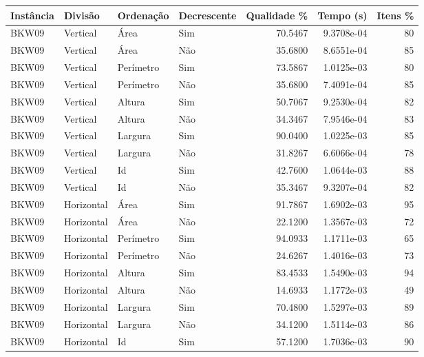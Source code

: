 \begin{tabular}{llllrrr}
\hline
Instância & Divisão     & Ordenação & Decrescente & Qualidade \% & Tempo (s)  & Itens \% \\
\hline
BKW09     & Vertical    & Área      & Sim         & 70.5467      & 9.3708e-04 & 80       \\
BKW09     & Vertical    & Área      & Não         & 35.6800      & 8.6551e-04 & 85       \\
BKW09     & Vertical    & Perímetro & Sim         & 73.5867      & 1.0125e-03 & 80       \\
BKW09     & Vertical    & Perímetro & Não         & 35.6800      & 7.4091e-04 & 85       \\
BKW09     & Vertical    & Altura    & Sim         & 50.7067      & 9.2530e-04 & 82       \\
BKW09     & Vertical    & Altura    & Não         & 34.3467      & 7.9546e-04 & 83       \\
BKW09     & Vertical    & Largura   & Sim         & 90.0400      & 1.0225e-03 & 85       \\
BKW09     & Vertical    & Largura   & Não         & 31.8267      & 6.6066e-04 & 78       \\
BKW09     & Vertical    & Id        & Sim         & 42.7600      & 1.0644e-03 & 88       \\
BKW09     & Vertical    & Id        & Não         & 35.3467      & 9.3207e-04 & 82       \\
BKW09     & Horizontal  & Área      & Sim         & 91.7867      & 1.6902e-03 & 95       \\
BKW09     & Horizontal  & Área      & Não         & 22.1200      & 1.3567e-03 & 72       \\
BKW09     & Horizontal  & Perímetro & Sim         & 94.0933      & 1.1711e-03 & 65       \\
BKW09     & Horizontal  & Perímetro & Não         & 24.6267      & 1.4016e-03 & 73       \\
BKW09     & Horizontal  & Altura    & Sim         & 83.4533      & 1.5490e-03 & 94       \\
BKW09     & Horizontal  & Altura    & Não         & 14.6933      & 1.1772e-03 & 49       \\
BKW09     & Horizontal  & Largura   & Sim         & 70.4800      & 1.5297e-03 & 89       \\
BKW09     & Horizontal  & Largura   & Não         & 34.1200      & 1.5114e-03 & 86       \\
BKW09     & Horizontal  & Id        & Sim         & 57.1200      & 1.7036e-03 & 90       \\

\end{tabular}
